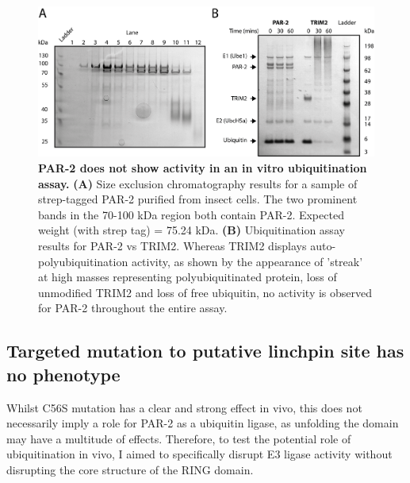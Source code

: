 \documentclass[12pt]{"report"}
\newcommand{\mycaption}[2]{\caption[#1]{\textbf{#1.} #2}}
\begin{document}
\begin{figure}
\includegraphics[scale=1]{ubiquitin_assay}
\centering
\mycaption{PAR-2 does not show activity in an in vitro ubiquitination assay}{
\textbf{(A)} Size exclusion chromatography results for a sample of strep-tagged PAR-2 purified from insect cells. The two prominent bands in the 70-100 kDa region both contain PAR-2. Expected weight (with strep tag) = 75.24 kDa.
\textbf{(B)} Ubiquitination assay results for PAR-2 vs TRIM2. Whereas TRIM2 displays auto-polyubiquitination activity, as shown by the appearance of 'streak' at high masses representing polyubiquitinated protein, loss of unmodified TRIM2 and loss of free ubiquitin, no activity is observed for PAR-2 throughout the entire assay. 
}
\label{fig:ubiquitin_assay}
\end{figure}


\subsection{Targeted mutation to putative linchpin site has no phenotype}

Whilst C56S mutation has a clear and strong effect in vivo, this does not necessarily imply a role for PAR-2 as a ubiquitin ligase, as unfolding the domain may have a multitude of effects. Therefore, to test the potential role of ubiquitination in vivo, I aimed to specifically disrupt E3 ligase activity without disrupting the core structure of the RING domain.\\
\end{document}
